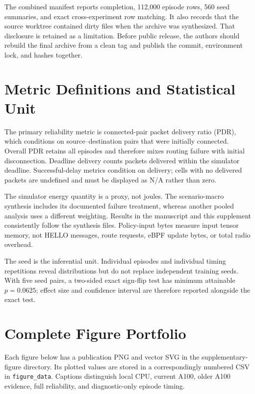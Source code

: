 \documentclass[drones,article,submit,moreauthors]{Definitions/mdpi}
\begin{document}
The combined manifest reports completion, 112,000 episode rows, 560 seed summaries, and exact cross-experiment row matching. It also records that the source worktree contained dirty files when the archive was synthesized. That disclosure is retained as a limitation. Before public release, the authors should rebuild the final archive from a clean tag and publish the commit, environment lock, and hashes together.

\section{Metric Definitions and Statistical Unit}

The primary reliability metric is connected-pair packet delivery ratio (PDR), which conditions on source--destination pairs that were initially connected. Overall PDR retains all episodes and therefore mixes routing failure with initial disconnection. Deadline delivery counts packets delivered within the simulator deadline. Successful-delay metrics condition on delivery; cells with no delivered packets are undefined and must be displayed as N/A rather than zero.

The simulator energy quantity is a proxy, not joules. The scenario-macro synthesis includes its documented failure treatment, whereas another pooled analysis uses a different weighting. Results in the manuscript and this supplement consistently follow the synthesis files. Policy-input bytes measure input tensor memory, not HELLO messages, route requests, eBPF update bytes, or total radio overhead.

The seed is the inferential unit. Individual episodes and individual timing repetitions reveal distributions but do not replace independent training seeds. With five seed pairs, a two-sided exact sign-flip test has minimum attainable $p=0.0625$; effect size and confidence interval are therefore reported alongside the exact test.

\section{Complete Figure Portfolio}

Each figure below has a publication PNG and vector SVG in the supplementary-figure directory. Its plotted values are stored in a correspondingly numbered CSV in \texttt{figure\_data}. Captions distinguish local CPU, current A100, older A100 evidence, full reliability, and diagnostic-only episode timing.
\end{document}
